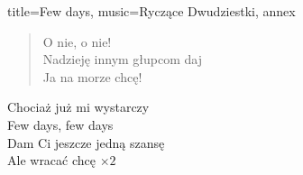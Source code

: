 \begin{song}{title={Few days}, music={Ryczące Dwudziestki}, annex}
\begin{multicols}{2}
\begin{verse}
        O nie, o nie! \\
        Nadzieję innym głupcom daj \\
        Ja na morze chcę!
    \end{verse}
    \begin{chorus}
        Chociaż już mi wystarczy \\
        Few days, few days \\
        Dam Ci jeszcze jedną szansę \\
        Ale wracać chcę $\times 2$
    \end{chorus}
\end{multicols}
\end{song}

